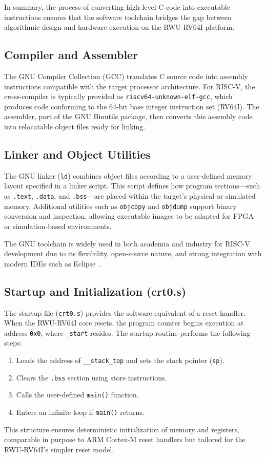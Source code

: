 \noindent In summary, the process of converting high-level C code into executable instructions ensures that the software toolchain bridges the gap between algorithmic design and hardware execution on the RWU-RV64I platform.


\subsection{Compiler and Assembler}
The GNU Compiler Collection (GCC) translates C source code into assembly instructions compatible with the target processor architecture.  
For RISC-V, the cross-compiler is typically provided as \texttt{riscv64-unknown-elf-gcc}, which produces code conforming to the 64-bit base integer instruction set (RV64I).  
The assembler, part of the GNU Binutils package, then converts this assembly code into relocatable object files ready for linking.

\subsection{Linker and Object Utilities}
The GNU linker (\texttt{ld}) combines object files according to a user-defined memory layout specified in a linker script.  
This script defines how program sections—such as \texttt{.text}, \texttt{.data}, and \texttt{.bss}—are placed within the target’s physical or simulated memory.  
Additional utilities such as \texttt{objcopy} and \texttt{objdump} support binary conversion and inspection, allowing executable images to be adapted for FPGA or simulation-based environments.

The GNU toolchain is widely used in both academia and industry for RISC-V development due to its flexibility, open-source nature, and strong integration with modern IDEs such as Eclipse~\cite{eclipse-cdt,riscv-gnu-toolchain}.
\subsection{Startup and Initialization (crt0.s)}
The startup file (\texttt{crt0.s}) provides the software equivalent of a reset handler.  
When the RWU-RV64I core resets, the program counter begins execution at address \texttt{0x0}, where \texttt{\_start} resides.  
The startup routine performs the following steps:
\begin{enumerate}
  \item Loads the address of \texttt{\_\_stack\_top} and sets the stack pointer (\texttt{sp}).
  \item Clears the \texttt{.bss} section using store instructions.
  \item Calls the user-defined \texttt{main()} function.
  \item Enters an infinite loop if \texttt{main()} returns.
\end{enumerate}
This structure ensures deterministic initialization of memory and registers, comparable in purpose to ARM Cortex-M reset handlers but tailored for the RWU-RV64I’s simpler reset model.

